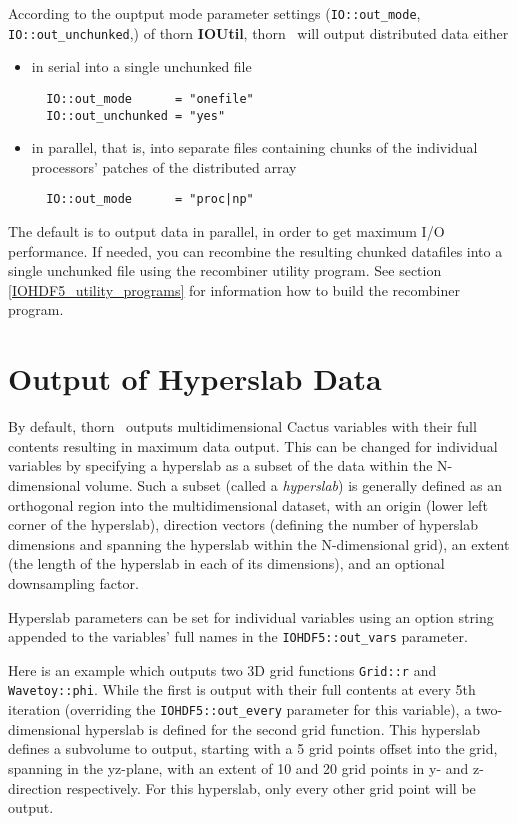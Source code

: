 \documentclass{article}
\begin{document}
According to the ouptput mode parameter settings ({\tt IO::out\_mode},
{\tt IO::out\_unchunked},) of thorn {\bf IOUtil}, thorn
\ThisThorn\ will output distributed data either
\begin{itemize}
  \item in serial into a single unchunked file
\begin{verbatim}
  IO::out_mode      = "onefile"
  IO::out_unchunked = "yes"
\end{verbatim}
  \item in parallel, that is, into separate files containing chunks of the
        individual processors' patches of the distributed array
\begin{verbatim}
  IO::out_mode      = "proc|np"
\end{verbatim}
\end{itemize}
The default is to output data in parallel, in order to get maximum I/O
performance. If needed, you can recombine the resulting chunked datafiles
into a single unchunked file using the recombiner utility program.
See section \ref{IOHDF5_utility_programs} for information how to build the
recombiner program.


\section{Output of Hyperslab Data}
\label{IOHDF5_output_hyperslabs}

By default, thorn \ThisThorn\ outputs multidimensional Cactus variables with
their full contents resulting in maximum data output. This can be changed for
individual variables by specifying a hyperslab as a subset of the data within
the N-dimensional volume. Such a subset (called a {\it hyperslab}) is generally
defined as an orthogonal region into the multidimensional dataset, with an
origin (lower left corner of the hyperslab), direction vectors (defining the
number of hyperslab dimensions and spanning the hyperslab within the
N-dimensional grid), an extent (the length of the hyperslab in each of its
dimensions), and an optional downsampling factor.

Hyperslab parameters can be set for individual variables using an option string
appended to the variables' full names in the {\tt IOHDF5::out\_vars} parameter.

Here is an example which outputs two 3D grid functions {\tt Grid::r} and {\tt
Wavetoy::phi}. While the first is output with their full contents at every
5th iteration (overriding the {\tt IOHDF5::out\_every} parameter for this
variable), a two-dimensional hyperslab is defined for the second grid function.
This hyperslab defines a subvolume to output, starting with a 5 grid points
offset into the grid, spanning in the yz-plane, with an extent of 10 and 20
grid points in y- and z-direction respectively. For this hyperslab, only every
other grid point will be output.
\end{document}
